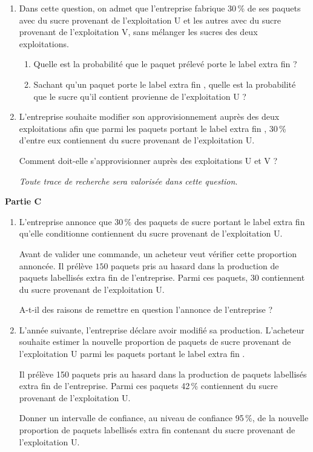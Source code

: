\documentclass[10pt,a4paper]{article}
\begin{document}
\medskip
 
\begin{enumerate}
\item Dans cette question, on admet que l'entreprise fabrique 30\,\% de ses paquets avec du sucre
provenant de l'exploitation U et les autres avec du sucre provenant de l'exploitation V,
sans mélanger les sucres des deux exploitations.
	\begin{enumerate}
		\item Quelle est la probabilité que le paquet prélevé porte le label \og extra fin \fg{} ?
		\item Sachant qu'un paquet porte le label \og extra fin \fg, quelle est la probabilité que le sucre
qu'il contient provienne de l'exploitation U ?
 	\end{enumerate}
\item L'entreprise souhaite modifier son approvisionnement auprès des deux exploitations afin
que parmi les paquets portant le label \og extra fin \fg, 30\,\% d'entre eux contiennent du sucre
provenant de l'exploitation U.
	
Comment doit-elle s'approvisionner auprès des exploitations U et V ?
	
\emph{Toute trace de recherche sera valorisée dans cette question}.
\end{enumerate}

\bigskip

\textbf{Partie C}

\medskip

\begin{enumerate}
\item L'entreprise annonce que 30\,\% des paquets de sucre portant le label \og extra fin \fg{} qu'elle
conditionne contiennent du sucre provenant de l'exploitation U.

Avant de valider une commande, un acheteur veut vérifier cette proportion annoncée. Il
prélève $150$ paquets pris au hasard dans la production de paquets labellisés \og extra fin \fg{} de
l'entreprise. Parmi ces paquets, $30$ contiennent du sucre provenant de l'exploitation U.

A-t-il des raisons de remettre en question l'annonce de l'entreprise ?
\item  L'année suivante, l'entreprise déclare avoir modifié sa production. L'acheteur souhaite
estimer la nouvelle proportion de paquets de sucre provenant de l'exploitation U parmi les
paquets portant le label \og extra fin \fg. 

Il prélève 150 paquets pris au hasard dans la production de paquets labellisés \og extra fin \fg{} de l'entreprise. Parmi ces paquets 42\,\% contiennent du sucre provenant de l'exploitation U.

Donner un intervalle de confiance, au niveau de confiance 95\,\%, de la nouvelle proportion
de paquets labellisés \og extra fin \fg{} contenant du sucre provenant de l'exploitation U.
\end{enumerate}
\end{document}
